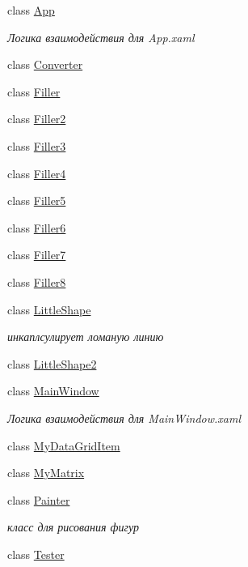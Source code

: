 \begin{DoxyCompactItemize}
\item 
class \hyperlink{classtwelve_1_1_app}{App}
\begin{DoxyCompactList}\small\item\em Логика взаимодействия для App.\+xaml \end{DoxyCompactList}\item 
class \hyperlink{classtwelve_1_1_converter}{Converter}
\item 
class \hyperlink{classtwelve_1_1_filler}{Filler}
\item 
class \hyperlink{classtwelve_1_1_filler2}{Filler2}
\item 
class \hyperlink{classtwelve_1_1_filler3}{Filler3}
\item 
class \hyperlink{classtwelve_1_1_filler4}{Filler4}
\item 
class \hyperlink{classtwelve_1_1_filler5}{Filler5}
\item 
class \hyperlink{classtwelve_1_1_filler6}{Filler6}
\item 
class \hyperlink{classtwelve_1_1_filler7}{Filler7}
\item 
class \hyperlink{classtwelve_1_1_filler8}{Filler8}
\item 
class \hyperlink{classtwelve_1_1_little_shape}{Little\+Shape}
\begin{DoxyCompactList}\small\item\em инкаплсулирует ломаную линию \end{DoxyCompactList}\item 
class \hyperlink{classtwelve_1_1_little_shape2}{Little\+Shape2}
\item 
class \hyperlink{classtwelve_1_1_main_window}{Main\+Window}
\begin{DoxyCompactList}\small\item\em Логика взаимодействия для Main\+Window.\+xaml \end{DoxyCompactList}\item 
class \hyperlink{classtwelve_1_1_my_data_grid_item}{My\+Data\+Grid\+Item}
\item 
class \hyperlink{classtwelve_1_1_my_matrix}{My\+Matrix}
\item 
class \hyperlink{classtwelve_1_1_painter}{Painter}
\begin{DoxyCompactList}\small\item\em класс для рисования фигур \end{DoxyCompactList}\item 
class \hyperlink{classtwelve_1_1_tester}{Tester}
\end{DoxyCompactItemize}
